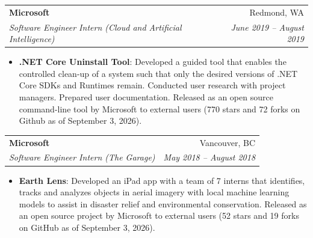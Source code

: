 \documentclass[letterpaper,11pt]{article}
\makeatletter
\newcommand{\resumeItem}[2]{
  \item\small{
    \textbf{#1}{: #2 \vspace{-2pt}}
  }
}
\newcommand{\resumeSubheading}[4]{
  \vspace{-1pt}\item
    \begin{tabular*}{0.97\textwidth}{l@{\extracolsep{\fill}}r}
      \textbf{#1} & #2 \\
      \textit{\small#3} & \textit{\small #4} \\
    \end{tabular*}\vspace{-5pt}
}
\newcommand{\resumeItemListStart}{\begin{itemize}}
\newcommand{\resumeItemListEnd}{\end{itemize}\vspace{-5pt}}
\makeatother
\begin{document}
    \resumeSubheading
      {Microsoft}{Redmond, WA}
      {Software Engineer Intern (Cloud and Artificial Intelligence)}{June 2019 -- August 2019}
      \resumeItemListStart
        \resumeItem{.NET Core Uninstall Tool}
          {Developed a guided tool that enables the controlled clean-up of a system such that only the desired versions of .NET Core SDKs and Runtimes remain. Conducted user research with project managers. Prepared user documentation. Released as an open source command-line tool by Microsoft to external users (770 stars and 72 forks on Github as of September 3, 2026).}
      \resumeItemListEnd

    \resumeSubheading
      {Microsoft}{Vancouver, BC}
      {Software Engineer Intern (The Garage)}{May 2018 -- August 2018}
      \resumeItemListStart
        \resumeItem{Earth Lens}
          {Developed an iPad app with a team of 7 interns that identifies, tracks and analyzes objects in aerial imagery with local machine learning models to assist in disaster relief and environmental conservation. Released as an open source project by Microsoft to external users (52 stars and 19 forks on GitHub as of September 3, 2026).}
      \resumeItemListEnd


\end{document}
